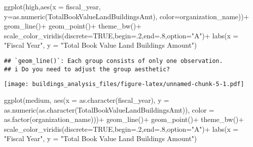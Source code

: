 \documentclass[
]{article}
\newenvironment{Shaded}{\begin{snugshade}}{\end{snugshade}}
\newcommand{\AttributeTok}[1]{\textcolor[rgb]{0.77,0.63,0.00}{#1}}
\newcommand{\ConstantTok}[1]{\textcolor[rgb]{0.00,0.00,0.00}{#1}}
\newcommand{\DecValTok}[1]{\textcolor[rgb]{0.00,0.00,0.81}{#1}}
\newcommand{\FunctionTok}[1]{\textcolor[rgb]{0.00,0.00,0.00}{#1}}
\newcommand{\NormalTok}[1]{#1}
\newcommand{\SpecialCharTok}[1]{\textcolor[rgb]{0.00,0.00,0.00}{#1}}
\newcommand{\StringTok}[1]{\textcolor[rgb]{0.31,0.60,0.02}{#1}}
\begin{document}
\begin{Shaded}
\begin{Highlighting}[]
  \FunctionTok{ggplot}\NormalTok{(high,}\FunctionTok{aes}\NormalTok{(}\AttributeTok{x =}\NormalTok{ fiscal\_year, }\AttributeTok{y=}\FunctionTok{as.numeric}\NormalTok{(TotalBookValueLandBuildingsAmt), }\AttributeTok{color=}\NormalTok{organization\_name))}\SpecialCharTok{+}
    \FunctionTok{geom\_line}\NormalTok{()}\SpecialCharTok{+}
    \FunctionTok{geom\_point}\NormalTok{()}\SpecialCharTok{+}
    \FunctionTok{theme\_bw}\NormalTok{()}\SpecialCharTok{+}
    \FunctionTok{scale\_color\_viridis}\NormalTok{(}\AttributeTok{discrete=}\ConstantTok{TRUE}\NormalTok{,}\AttributeTok{begin=}\NormalTok{.}\DecValTok{2}\NormalTok{,}\AttributeTok{end=}\NormalTok{.}\DecValTok{8}\NormalTok{,}\AttributeTok{option=}\StringTok{"A"}\NormalTok{)}\SpecialCharTok{+}
    \FunctionTok{labs}\NormalTok{(}\AttributeTok{x =} \StringTok{"Fiscal Year"}\NormalTok{, }\AttributeTok{y =} \StringTok{"Total Book Value Land Buildings Amount"}\NormalTok{)}
\end{Highlighting}
\end{Shaded}

\begin{verbatim}
## `geom_line()`: Each group consists of only one observation.
## i Do you need to adjust the group aesthetic?
\end{verbatim}

\texttt{[image: buildings\_analysis\_files/figure-latex/unnamed-chunk-5-1.pdf]}

\begin{Shaded}
\begin{Highlighting}[]
  \FunctionTok{ggplot}\NormalTok{(medium, }\FunctionTok{aes}\NormalTok{(}\AttributeTok{x =} \FunctionTok{as.character}\NormalTok{(fiscal\_year), }\AttributeTok{y =} \FunctionTok{as.numeric}\NormalTok{(}\FunctionTok{as.character}\NormalTok{(TotalBookValueLandBuildingsAmt)), }\AttributeTok{color =} \FunctionTok{as.factor}\NormalTok{(organization\_name)))}\SpecialCharTok{+}
    \FunctionTok{geom\_line}\NormalTok{()}\SpecialCharTok{+}
    \FunctionTok{geom\_point}\NormalTok{()}\SpecialCharTok{+}
    \FunctionTok{theme\_bw}\NormalTok{()}\SpecialCharTok{+}
    \FunctionTok{scale\_color\_viridis}\NormalTok{(}\AttributeTok{discrete=}\ConstantTok{TRUE}\NormalTok{,}\AttributeTok{begin=}\NormalTok{.}\DecValTok{2}\NormalTok{,}\AttributeTok{end=}\NormalTok{.}\DecValTok{8}\NormalTok{,}\AttributeTok{option=}\StringTok{"A"}\NormalTok{)}\SpecialCharTok{+}
    \FunctionTok{labs}\NormalTok{(}\AttributeTok{x =} \StringTok{"Fiscal Year"}\NormalTok{, }\AttributeTok{y =} \StringTok{"Total Book Value Land Buildings Amount"}\NormalTok{)}
\end{Highlighting}
\end{Shaded}
\end{document}
